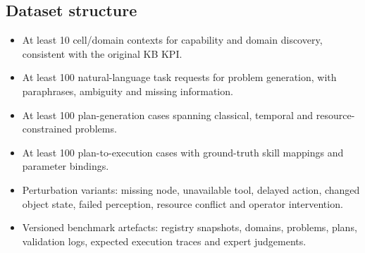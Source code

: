 \documentclass{plan4ari_report}
\begin{document}
\subsection{Dataset structure}
\begin{itemize}
\item At least 10 cell/domain contexts for capability and domain discovery, consistent with the original KB KPI.
\item At least 100 natural-language task requests for problem generation, with paraphrases, ambiguity and missing information.
\item At least 100 plan-generation cases spanning classical, temporal and resource-constrained problems.
\item At least 100 plan-to-execution cases with ground-truth skill mappings and parameter bindings.
\item Perturbation variants: missing node, unavailable tool, delayed action, changed object state, failed perception, resource conflict and operator intervention.
\item Versioned benchmark artefacts: registry snapshots, domains, problems, plans, validation logs, expected execution traces and expert judgements.
\end{itemize}
\end{document}
